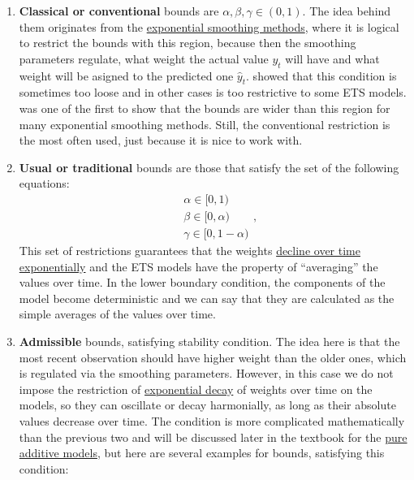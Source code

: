 \documentclass[
]{book}
\theoremstyle{definition}
\theoremstyle{definition}
\theoremstyle{definition}
\theoremstyle{definition}
\theoremstyle{remark}
\begin{document}
\begin{enumerate}
\def\labelenumi{\arabic{enumi}.}
\item
  \textbf{Classical or conventional} bounds are \(\alpha, \beta, \gamma \in (0,1)\). The idea behind them originates from the \protect\hyperlink{SES}{exponential smoothing methods}, where it is logical to restrict the bounds with this region, because then the smoothing parameters regulate, what weight the actual value \(y_t\) will have and what weight will be asigned to the predicted one \(\hat{y}_t\). \citet{Hyndman2008b} showed that this condition is sometimes too loose and in other cases is too restrictive to some ETS models. \citet{Brenner1968} was one of the first to show that the bounds are wider than this region for many exponential smoothing methods. Still, the conventional restriction is the most often used, just because it is nice to work with.
\item
  \textbf{Usual or traditional} bounds are those that satisfy the set of the following equations:
  \begin{equation}
    \begin{aligned}
    &\alpha \in [0, 1)\\
    &\beta \in [0, \alpha) \\
    &\gamma \in [0, 1-\alpha)
    \end{aligned},
    \label{eq:ETSUsualBounds}
  \end{equation}
  This set of restrictions guarantees that the weights \protect\hyperlink{whyExponential}{decline over time exponentially} and the ETS models have the property of ``averaging'' the values over time. In the lower boundary condition, the components of the model become deterministic and we can say that they are calculated as the simple averages of the values over time.
\item
  \textbf{Admissible} bounds, satisfying stability condition. The idea here is that the most recent observation should have higher weight than the older ones, which is regulated via the smoothing parameters. However, in this case we do not impose the restriction of \href{whyExponential}{exponential decay} of weights over time on the models, so they can oscillate or decay harmonially, as long as their absolute values decrease over time. The condition is more complicated mathematically than the previous two and will be discussed later in the textbook for the \protect\hyperlink{ADAMETSPureAdditive}{pure additive models}, but here are several examples for bounds, satisfying this condition:
\end{enumerate}
\end{document}
